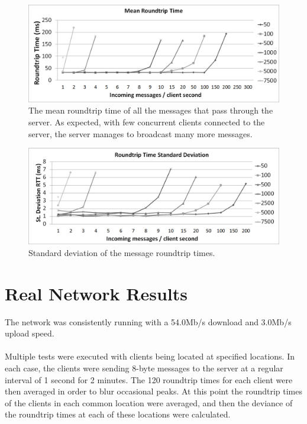 \documentclass[bsc,frontabs,twoside,singlespacing,parskip,deptreport]{infthesis}     %
\begin{document}
\begin{center}

\begin{figure}[H]
\centering
\includegraphics[scale=0.32]{images/test_SERVER_RTTmean.jpg}
\caption{The mean roundtrip time of all the messages that pass through the server. As expected, with few concurrent clients connected to the server, the server manages to broadcast many more messages.}
\label{fig:broadcast_rtt_mean}
\end{figure}



\begin{figure}[H]
\centering
\includegraphics[scale=0.32]{images/test_SERVER_RTTstd.jpg}
\caption{Standard deviation of the message roundtrip times.}
\label{fig:broadcast_rtt_std}
\end{figure}

\end{center}



\section{Real Network Results}
The network was consistently running with a 54.0Mb/s download and 3.0Mb/s upload speed.
\paragraph*{}Multiple tests were executed with clients being located at specified locations. In each case, the clients were sending 8-byte messages to the server at a regular interval of 1 second for 2 minutes. The 120 roundtrip times for each client were then averaged in order to blur occasional peaks. At this point the roundtrip times of the clients in each common location were averaged, and then the deviance of the roundtrip times at each of these locations were calculated.
\end{document}
